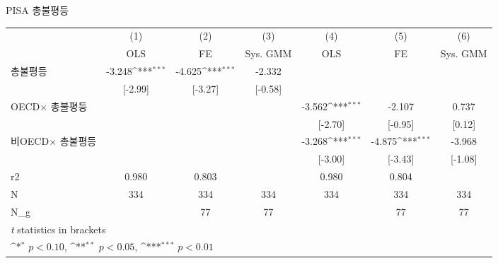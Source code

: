 \centering
\def\sym#1{\ifmmode^{#1}\else\(^{#1}\)\fi}
\caption{PISA 총불평등\label{tab:pisasimp}}
\begin{tabular}{l*{6}{c}}
\toprule
                    &\multicolumn{1}{c}{(1)}&\multicolumn{1}{c}{(2)}&\multicolumn{1}{c}{(3)}&\multicolumn{1}{c}{(4)}&\multicolumn{1}{c}{(5)}&\multicolumn{1}{c}{(6)}\\ &\multicolumn{1}{c}{OLS}&\multicolumn{1}{c}{FE}&\multicolumn{1}{c}{Sys. GMM}&\multicolumn{1}{c}{OLS}&\multicolumn{1}{c}{FE}&\multicolumn{1}{c}{Sys. GMM}\\
\midrule
총불평등          &      -3.248\sym{***}&      -4.625\sym{***}&      -2.332         &                     &                     &                     \\
                    &     [-2.99]         &     [-3.27]         &     [-0.58]         &                     &                     &                     \\
\addlinespace
OECD$ \times$ 총불평등&                     &                     &                     &      -3.562\sym{***}&      -2.107         &       0.737         \\
                    &                     &                     &                     &     [-2.70]         &     [-0.95]         &      [0.12]         \\
\addlinespace
비OECD$ \times$ 총불평등&                     &                     &                     &      -3.268\sym{***}&      -4.875\sym{***}&      -3.968         \\
                    &                     &                     &                     &     [-3.00]         &     [-3.43]         &     [-1.08]         \\
\midrule
r2                  &       0.980         &       0.803         &                     &       0.980         &       0.804         &                     \\
N                   &         334         &         334         &         334         &         334         &         334         &         334         \\
N\_g                 &                     &          77         &          77         &                     &          77         &          77         \\
\bottomrule
\multicolumn{7}{l}{\footnotesize \textit{t} statistics in brackets}\\
\multicolumn{7}{l}{\footnotesize \sym{*} \(p<0.10\), \sym{**} \(p<0.05\), \sym{***} \(p<0.01\)}\\
\end{tabular}
